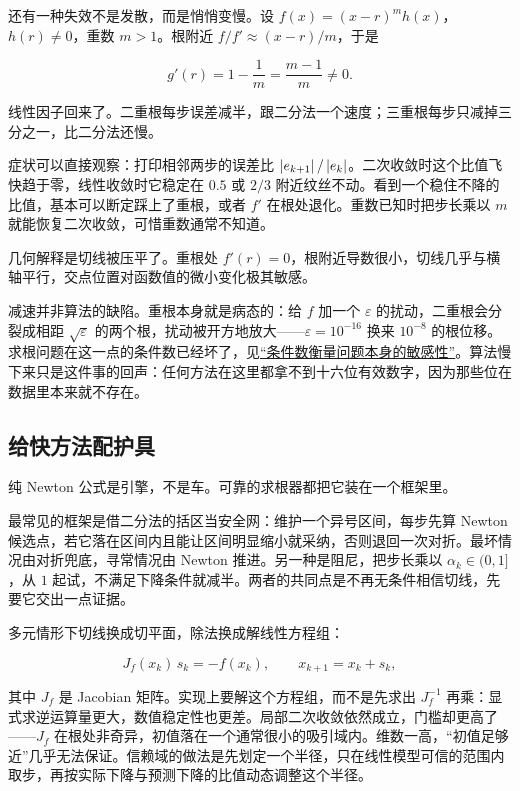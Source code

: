 还有一种失效不是发散，而是悄悄变慢。设 \(f(x)=(x-r)^mh(x)\)，\(h(r)\ne0\)，重数 \(m>1\)。根附近 \(f/f'\approx(x-r)/m\)，于是

\[
g'(r)=1-\frac1m=\frac{m-1}{m}\ne0 .
\]

线性因子回来了。二重根每步误差减半，跟二分法一个速度；三重根每步只减掉三分之一，比二分法还慢。

症状可以直接观察：打印相邻两步的误差比 \(\left|e_{k+1}\right|/\left|e_k\right|\)。二次收敛时这个比值飞快趋于零，线性收敛时它稳定在 \(0.5\) 或 \(2/3\) 附近纹丝不动。看到一个稳住不降的比值，基本可以断定踩上了重根，或者 \(f'\) 在根处退化。重数已知时把步长乘以 \(m\) 就能恢复二次收敛，可惜重数通常不知道。

几何解释是切线被压平了。重根处 \(f'(r)=0\)，根附近导数很小，切线几乎与横轴平行，交点位置对函数值的微小变化极其敏感。

减速并非算法的缺陷。重根本身就是病态的：给 \(f\) 加一个 \(\varepsilon\) 的扰动，二重根会分裂成相距 \(\sqrt\varepsilon\) 的两个根，扰动被开方地放大——\(\varepsilon=10^{-16}\) 换来 \(10^{-8}\) 的根位移。求根问题在这一点的条件数已经坏了，见\hyperref[sec:08-Numerical-Analysis/01-Floating-Point-and-Error/03]{``条件数衡量问题本身的敏感性''}。算法慢下来只是这件事的回声：任何方法在这里都拿不到十六位有效数字，因为那些位在数据里本来就不存在。

\subsection{给快方法配护具}

纯 Newton 公式是引擎，不是车。可靠的求根器都把它装在一个框架里。

最常见的框架是借二分法的括区当安全网：维护一个异号区间，每步先算 Newton 候选点，若它落在区间内且能让区间明显缩小就采纳，否则退回一次对折。最坏情况由对折兜底，寻常情况由 Newton 推进。另一种是阻尼，把步长乘以 \(\alpha_k\in(0,1]\)，从 \(1\) 起试，不满足下降条件就减半。两者的共同点是不再无条件相信切线，先要它交出一点证据。

多元情形下切线换成切平面，除法换成解线性方程组：

\[
J_f(x_k)\,s_k=-f(x_k),\qquad x_{k+1}=x_k+s_k,
\]

其中 \(J_f\) 是 Jacobian 矩阵。实现上要解这个方程组，而不是先求出 \(J_f^{-1}\) 再乘：显式求逆运算量更大，数值稳定性也更差。局部二次收敛依然成立，门槛却更高了——\(J_f\) 在根处非奇异，初值落在一个通常很小的吸引域内。维数一高，``初值足够近''几乎无法保证。信赖域的做法是先划定一个半径，只在线性模型可信的范围内取步，再按实际下降与预测下降的比值动态调整这个半径。

